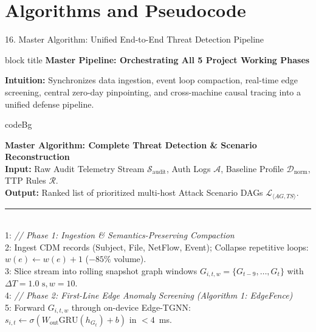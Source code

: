 \documentclass[aspectratio=169,10pt]{beamer}
\begin{document}
\section{Algorithms and Pseudocode}

\begin{frame}{16. Master Algorithm: Unified End-to-End Threat Detection Pipeline}
\vspace{-0.30em}
\begin{beamercolorbox}[rounded=true,shadow=false,sep=0.25em,wd=\textwidth]{block title}
\textbf{\scriptsize Master Pipeline: Orchestrating All 5 Project Working Phases}
\end{beamercolorbox}
\vspace{0.08em}
{\fontsize{6.0pt}{7.5pt}\selectfont
\textbf{Intuition:} Synchronizes data ingestion, event loop compaction, real-time edge screening, central zero-day pinpointing, and cross-machine causal tracing into a unified defense pipeline.
}
\vspace{0.10em}
\centering
\begin{beamercolorbox}[rounded=true,shadow=false,sep=0.20em,wd=0.98\textwidth]{codeBg}
{\fontsize{4.8pt}{5.8pt}\selectfont\ttfamily
\textbf{Master Algorithm: Complete Threat Detection \& Scenario Reconstruction}\\
\textbf{Input:} Raw Audit Telemetry Stream $\mathcal{S}_{\text{audit}}$, Auth Logs $\mathcal{A}$, Baseline Profile $\mathcal{D}_{\text{norm}}$, TTP Rules $\mathcal{R}$.\\
\textbf{Output:} Ranked list of prioritized multi-host Attack Scenario DAGs $\mathcal{L}_{\langle AG, TS \rangle}$.\\[0.03cm]
\rule{\linewidth}{0.3pt}\\[0.03cm]
1: \textit{// Phase 1: Ingestion \& Semantics-Preserving Compaction}\\
2: Ingest CDM records (Subject, File, NetFlow, Event); Collapse repetitive loops: $w(e) \leftarrow w(e)+1$ ($-85\%$ volume).\\
3: Slice stream into rolling snapshot graph windows $G_{i,t,w} = \{G_{t-9}, \dots, G_t\}$ with $\Delta T=1.0\text{ s}, w=10$.\\
4: \textit{// Phase 2: First-Line Edge Anomaly Screening (Algorithm 1: EdgeFence)}\\
5: Forward $G_{i,t,w}$ through on-device Edge-TGNN: $s_{i,t} \leftarrow \sigma(W_{\text{out}} \text{GRU}(h_{G_t}) + b)$ in $<4$~ms.\\
}
\end{beamercolorbox}
\end{frame}
\end{document}
